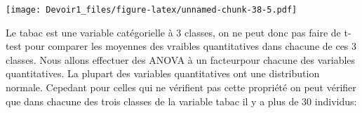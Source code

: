\documentclass[]{article}
\newenvironment{Shaded}{\begin{snugshade}}{\end{snugshade}}
\newcommand{\KeywordTok}[1]{\textcolor[rgb]{0.13,0.29,0.53}{\textbf{#1}}}
\newcommand{\DataTypeTok}[1]{\textcolor[rgb]{0.13,0.29,0.53}{#1}}
\newcommand{\DecValTok}[1]{\textcolor[rgb]{0.00,0.00,0.81}{#1}}
\newcommand{\StringTok}[1]{\textcolor[rgb]{0.31,0.60,0.02}{#1}}
\newcommand{\OperatorTok}[1]{\textcolor[rgb]{0.81,0.36,0.00}{\textbf{#1}}}
\newcommand{\NormalTok}[1]{#1}
\begin{document}
\begin{Shaded}
\end{Shaded}

\texttt{[image: Devoir1\_files/figure-latex/unnamed-chunk-38-5.pdf]}

Le tabac est une variable catégorielle à 3 classes, on ne peut donc pas
faire de t-test pour comparer les moyennes des vraibles quantitatives
dans chacune de ces 3 classes. Nous allons effectuer des ANOVA à un
facteurpour chacune des variables quantitatives. La plupart des
variables quantitatives ont une distribution normale. Cepedant pour
celles qui ne vérifient pas cette propriété on peut vérifier que dans
chacune des trois classes de la variable tabac il y a plus de 30
individus:

\begin{Shaded}
\end{Shaded}
\end{document}
